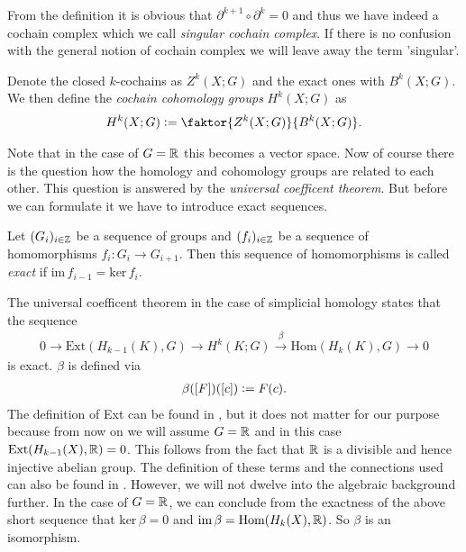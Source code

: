 \documentclass[../main.tex]{subfiles}
\begin{document}
From the definition it is obvious that $\partial^{k+1} \circ \partial^{k} = 0$ 
and thus we have indeed a cochain complex which we call \textit{singular cochain 
complex}. If there is no confusion with the general notion of cochain complex
we will leave away the term 'singular'.
\begin{definition}
    Denote the closed $k$-cochains as $Z^k(X;G)$ and the 
    exact ones with $B^k(X;G)$. 
    We then define the \textit{cochain cohomology groups}
    $H^k(X;G)$ as
    \begin{align*}
        H^k(X;G) \vcentcolon= \faktor{Z^k(X;G)}{B^k(X;G)}.
    \end{align*}
\end{definition}
Note that in the case of $G = \mathbb{R}$ this becomes a vector space.
Now of course there is the question how the homology and cohomology groups 
are related to each other. This question is answered by the
\textit{universal coefficent theorem}. But before we can formulate it we have 
to introduce exact sequences.
\begin{definition}
    Let $(G_i)_{i\in \mathbb{Z}}$ be a sequence of groups and 
    $(f_i)_{i \in \mathbb{Z}}$ be a sequence of homomorphisms
    $f_i: G_i \rightarrow G_{i+1}$. Then this sequence of homomorphisms is
    called \textit{exact} if $\text{im}\,f_{i-1} = \text{ker}\,f_i$.
\end{definition}

The universal coefficent theorem in the case of simplicial homology states
that the sequence 
\begin{align}
    0 \rightarrow \text{Ext}(H_{k-1}(K),G) \rightarrow 
    H^k(K;G) \xrightarrow{\beta} \text{Hom}(H_k(K),G) 
    \rightarrow 0 \label{eq:univeral_coefficient_theorem}
\end{align}
is exact. 
$\beta$ is defined via 
\begin{align}
    \beta([F])([c]) \vcentcolon= F(c).
    \label{eq:isomorphism_from_universal_coefficent_theorem}
\end{align}
The definition of Ext can be found in \cite{topology_and_geometry},
but it does not matter for our purpose because from now on we will assume
$G = \mathbb{R}$ and in this case
$\text{Ext}(H_{k-1}(X),\mathbb{R}) = 0$. This follows from the fact that 
$\mathbb{R}$ is a divisible and hence injective abelian group. The definition of
these terms and the connections used can also be found in 
\cite[Sec.\,V.6]{topology_and_geometry}. However, we will not dwelve into the 
algebraic background further. In the case of $G = \mathbb{R}$, 
we can conclude from the exactness of the 
above short sequence that $\text{ker}\,\beta = 0$ and 
$\text{im}\,\beta = \text{Hom}(H_k(X),\mathbb{R})$. So $\beta$ is an isomorphism.
\end{document}
